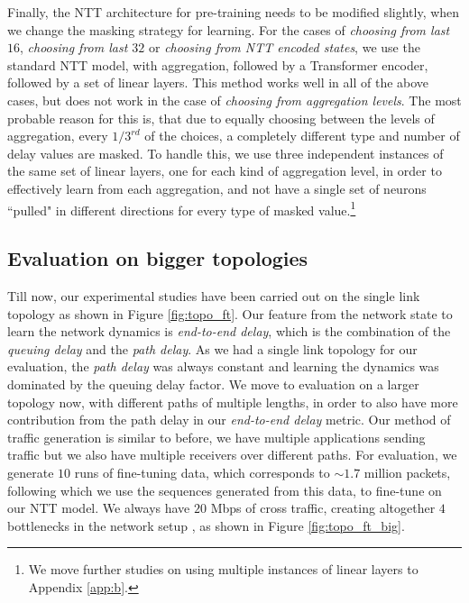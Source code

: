 Finally, the NTT architecture for pre-training needs to be modified slightly, when we change the masking strategy for learning. For the cases of \emph{choosing from last $16$}, \emph{choosing from last $32$} or \emph{choosing from NTT encoded states}, we use the standard NTT model, with aggregation, followed by a Transformer encoder, followed by a set of linear layers. This method works well in all of the above cases, but does not work in the case of \emph{choosing from aggregation levels}. The most probable reason for this is, that due to equally choosing between the levels of aggregation, every $1/3^{rd}$ of the choices, a completely different type and number of delay values are masked. To handle this, we use three independent instances of the same set of linear layers, one for each kind of aggregation level, in order to effectively learn from each aggregation, and not have a single set of neurons ``pulled" in different directions for every type of masked value.\footnote{We move further studies on using multiple instances of linear layers to Appendix \ref{app:b}.}


\subsection{Evaluation on bigger topologies}
\label{ssec:comptop}

Till now, our experimental studies have been carried out on the single link topology as shown in Figure \ref{fig:topo_ft}. Our feature from the network state to learn the network dynamics is \emph{end-to-end delay}, which is the combination of the \emph{queuing delay} and the \emph{path delay}. As we had a single link topology for our evaluation, the \emph{path delay} was always constant and learning the dynamics was dominated by the queuing delay factor. We move to evaluation on a larger topology now, with different paths of multiple lengths, in order to also have more contribution from the path delay in our \emph{end-to-end delay} metric. Our method of traffic generation is similar to before, we have multiple applications sending traffic but we also have multiple receivers over different paths. For evaluation, we generate $10$ runs of fine-tuning data, which corresponds to ${\sim}1.7$ million packets, following which we use the sequences generated from this data, to fine-tune on our NTT model. We always have $20$ Mbps of cross traffic, creating altogether $4$ bottlenecks in the network setup , as shown in Figure \ref {fig:topo_ft_big}.

